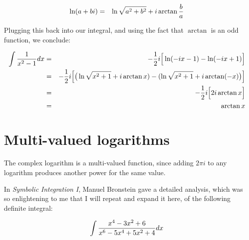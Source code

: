 \begin{eqnarray*}
\ln(a+bi) &=& \ln\sqrt{a^2+b^2} +i\arctan{b\over a} \\
\end{eqnarray*}

Plugging this back into our integral, and using the fact that
$\arctan$ is an odd function, we conclude:

\begin{eqnarray*}
\int{1\over{x^2-1}}dx &=& -{1\over2}i\Big[\ln(-ix-1) - \ln(-ix+1)\Big] \\
&=& -{1\over2}i \Big[\big(\ln\sqrt{x^2+1} + i\arctan{x}) - (\ln\sqrt{x^2+1} + i\arctan(-x)\big) \Big] \\
&=& -{1\over2}i \Big[2 i\arctan{x} \Big] \\
&=& \arctan{x}
\end{eqnarray*}

\section{Multi-valued logarithms}

The complex logarithm is a multi-valued function, since adding $2\pi i$
to any logarithm produces another power for the same value.

In {\it Symbolic Integration I}, Manuel Bronstein gave a detailed
analysis, which was so enlightening to me that I will repeat
and expand it here, of the following definite integral:


$$\int {{x^4-3x^2+6}\over{x^6-5x^4+5x^2+4}} dx $$

